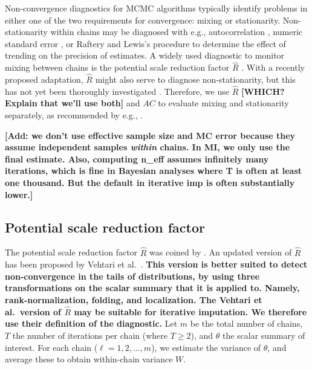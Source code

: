 \documentclass[Royal,times,sageh]{sagej}
\begin{document}
Non-convergence diagnostics for MCMC algorithms typically identify problems in either one of the two requirements for convergence: mixing or stationarity. Non-stationarity within chains may be diagnosed with e.g., autocorrelation \citep[\(AC\);][]{scha97, gelm13}, numeric standard error \citep[`MC error';][]{gewe92}, or Raftery and Lewis's \citeyearpar{raft91} procedure to determine the effect of trending on the precision of estimates. A widely used diagnostic to monitor mixing between chains is the potential scale reduction factor \(\widehat{R}\) \citep[`Gelman-Rubin statistic';][]{gelm92}. With a recently proposed adaptation, \(\widehat{R}\) might also serve to diagnose non-stationarity, but this has not yet been thoroughly investigated \citep{veht19}. Therefore, we use \(\widehat{R}\) \textbf{{[}WHICH? Explain that we'll use both{]}} and \(AC\) to evaluate mixing and stationarity separately, as recommended by e.g., \citet{cowl96}.

\textbf{{[}Add: we don't use effective sample size and MC error because they assume independent samples \emph{within} chains. In MI, we only use the final estimate. Also, computing n\_eff assumes infinitely many iterations, which is fine in Bayesian analyses where T is often at least one thousand. But the default in iterative imp is often substantially lower.{]}}

\hypertarget{potential-scale-reduction-factor}{%
\subsection{Potential scale reduction factor}\label{potential-scale-reduction-factor}}

The potential scale reduction factor \(\widehat{R}\) was coined by \citet{gelm92}. An updated version of \(\widehat{R}\) has been proposed by Vehtari et al.~\citeyearpar[p.~5]{veht19}. \textbf{This version is better suited to detect non-convergence in the tails of distributions, by using three transformations on the scalar summary that it is applied to. Namely, rank-normalization, folding, and localization. The Vehtari et al.~version of \(\widehat{R}\) may be suitable for iterative imputation. We therefore use their definition of the diagnostic.} Let \(m\) be the total number of chains, \(T\) the number of iterations per chain (where \(T\geq2\)), and \(\theta\) the scalar summary of interest. For each chain (\(\ell = 1, 2, \dots, m\)), we estimate the variance of \(\theta\), and average these to obtain within-chain variance \(W\).
\end{document}
